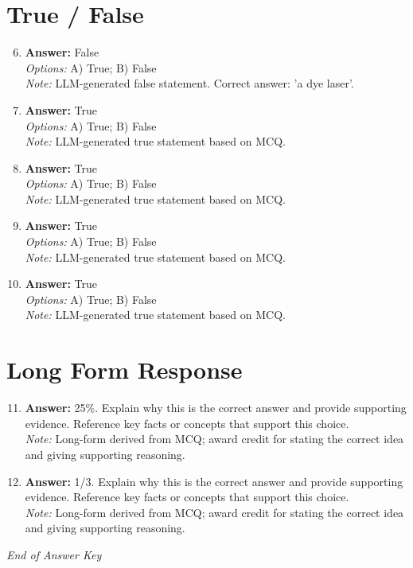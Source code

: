 \documentclass[12pt]{article}
\begin{document}
\section*{True / False}
\begin{enumerate}[label=\arabic*.]
\setcounter{enumi}{5}
\item \textbf{Answer:} False
\\ \textit{Options:} A) True; B) False
\\ \textit{Note:} LLM-generated false statement. Correct answer: 'a dye laser'.
\item \textbf{Answer:} True
\\ \textit{Options:} A) True; B) False
\\ \textit{Note:} LLM-generated true statement based on MCQ.
\item \textbf{Answer:} True
\\ \textit{Options:} A) True; B) False
\\ \textit{Note:} LLM-generated true statement based on MCQ.
\item \textbf{Answer:} True
\\ \textit{Options:} A) True; B) False
\\ \textit{Note:} LLM-generated true statement based on MCQ.
\item \textbf{Answer:} True
\\ \textit{Options:} A) True; B) False
\\ \textit{Note:} LLM-generated true statement based on MCQ.
\end{enumerate}

\section*{Long Form Response}
\begin{enumerate}[label=\arabic*.]
\setcounter{enumi}{10}
\item \textbf{Answer:} 25\%. Explain why this is the correct answer and provide supporting evidence. Reference key facts or concepts that support this choice.
\\ \textit{Note:} Long-form derived from MCQ; award credit for stating the correct idea and giving supporting reasoning.
\item \textbf{Answer:} 1/3. Explain why this is the correct answer and provide supporting evidence. Reference key facts or concepts that support this choice.
\\ \textit{Note:} Long-form derived from MCQ; award credit for stating the correct idea and giving supporting reasoning.
\end{enumerate}

\vfill
\noindent\textit{End of Answer Key}
\end{document}

